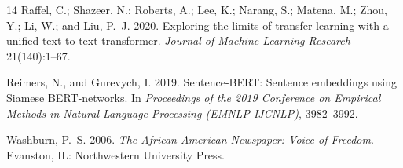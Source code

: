 \documentclass[letterpaper,twocolumn,10pt]{article}
\begin{document}
\begin{thebibliography}{14}
Raffel, C.; Shazeer, N.; Roberts, A.; Lee, K.; Narang, S.; Matena, M.;
Zhou, Y.; Li, W.; and Liu, P.~J. 2020. Exploring the limits of transfer
learning with a unified text-to-text transformer. \emph{Journal of
Machine Learning Research} 21(140):1--67.

Reimers, N., and Gurevych, I. 2019. Sentence-BERT: Sentence embeddings
using Siamese BERT-networks. In \emph{Proceedings of the 2019 Conference
on Empirical Methods in Natural Language Processing (EMNLP-IJCNLP)},
3982--3992.

Washburn, P.~S. 2006. \emph{The African American Newspaper: Voice of
Freedom}. Evanston, IL: Northwestern University Press.

\end{thebibliography}
\end{document}
